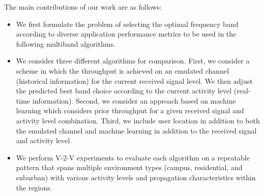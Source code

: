 


The main contributions of our work are as follows:
\begin{itemize}
\item We first formulate the problem of selecting the optimal 
frequency band according to diverse application performance metrics
to be used in the following multiband algorithms.
\item We consider three different algorithms for comparison.  First, we consider a scheme
in which the throughput is achieved on an emulated channel (historical information) for
the current received signal level. We then adjust the predicted best band choice according to the current activity
level (real-time information). 
Second, we consider an approach based on machine learning which
considers prior throughput for a given received signal and activity level
combination.  
Third, we include user location in addition to both the emulated channel and machine learning in addition to the received signal and activity level.
\item We perform V-2-V experiments to evaluate each algorithm on a repeatable pattern that
spans multiple environment types (campus, residential, and suburban) with various activity
levels and propagation characteristics within the regions. 
\end{itemize}


